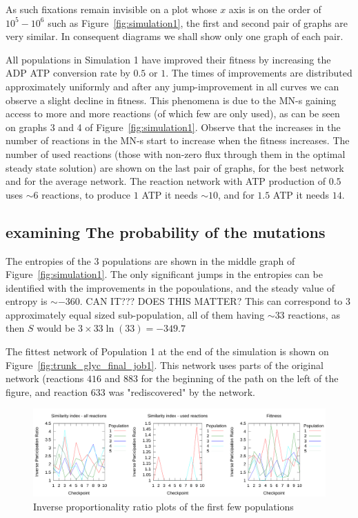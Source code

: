 \documentclass[10pt,a4paper]{article}
\begin{document}
As such fixations remain invisible on a plot whose $x$ axis is on the order of $10^5-10^6$ such as Figure~\ref{fig:simulation1}, the first and second pair of graphs are very similar. In consequent diagrams we shall show only one graph of each pair.

All populations in Simulation 1 have improved their fitness by increasing the ADP ATP conversion rate by $0.5$ or $1$. The times of improvements are distributed approximately uniformly and after any jump-improvement in all curves we can observe a slight decline in fitness. This phenomena is due to the MN-s gaining access to more and more reactions (of which few are only used), as can be seen on graphs 3 and 4 of Figure~\ref{fig:simulation1}. Observe that the increases in the number of reactions in the MN-s start to increase when the fitness increases. The number of used reactions (those with non-zero flux through them in the optimal steady state solution) are shown on the last pair of graphs, for the best network and for the average network. The reaction network with ATP production of $0.5$ uses $\sim 6$ reactions, to produce $1$ ATP it needs $\sim 10$, and for $1.5$ ATP it needs $14$. 

\subsection{examining The probability of the mutations}
\label{sub:the_probability_of_the_mutations}



The entropies of the $3$ populations are shown in the middle graph of Figure~\ref{fig:simulation1}. The only significant jumps in the entropies can be identified with the improvements in the popoulations, and the steady value of entropy is $\sim -360$. CAN IT??? DOES THIS MATTER? This can correspond to $3$ approximately equal sized sub-population, all of them having $\sim 33$ reactions, as then $S$ would be $3\times 33 \ln \left( 33 \right)=-349.7$

The fittest network of Population 1 at the end of the simulation is shown on Figure~\ref{fig:trunk_glyc_final_job1}. This network uses parts of the original network (reactions $416$ and $883$ for the beginning of the path on the left of the figure, and reaction $633$ was "rediscovered" by the network. 

\begin{figure}[htpb]
	\centering
	\includegraphics[width=1\linewidth]{IPR_longerlog.pdf}
	\caption{Inverse proportionality ratio plots of the first few populations}
	\label{fig:IPR_firstrun}
\end{figure}
\end{document}
